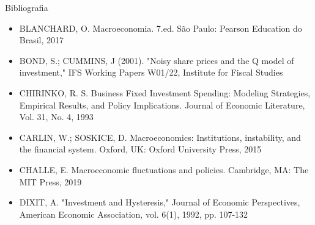 \documentclass[10pt]{beamer}
\begin{document}
\begin{frame}{ Bibliografia}
    \begin{itemize}        
        \item BLANCHARD, O. Macroeconomia. 7.ed. São Paulo: Pearson Education do Brasil, 2017\medskip        
        \item BOND, S.; CUMMINS, J (2001). "Noisy share prices and the Q model of investment," IFS Working Papers W01/22, Institute for Fiscal Studies\medskip
        \item CHIRINKO, R. S. Business Fixed Investment Spending: Modeling Strategies, Empirical Results, and Policy Implications. Journal of Economic Literature, Vol. 31, No. 4, 1993\medskip
        \item CARLIN, W.; SOSKICE, D. Macroeconomics: Institutions, instability, and the financial system. Oxford, UK: Oxford University Press, 2015\medskip
        \item CHALLE, E. Macroeconomic fluctuations and policies. Cambridge, MA: The MIT Press, 2019\medskip
        \item DIXIT, A. "Investment and Hysteresis," Journal of Economic Perspectives, American Economic Association, vol. 6(1), 1992, pp. 107-132
    \end{itemize}
\end{frame}
\end{document}
